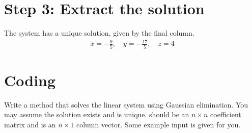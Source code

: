 \documentclass[letterpaper,10pt,english]{jupyterBook}
\begin{document}
\section{Step 3: Extract the solution}
\label{\detokenize{lessons/Gaussian_Elimination-student:step-3-extract-the-solution}}
\sphinxAtStartPar
The system has a unique solution, given by the final column.
\begin{equation*}
\begin{split}
x = -\frac95, \quad y = -\frac{17}{5}, \quad z = 4
\end{split}
\end{equation*}

\section{Coding}
\label{\detokenize{lessons/Gaussian_Elimination-student:coding}}
\sphinxAtStartPar
Write a method  that solves the linear system  using Gaussian elimination. You may assume the solution exists and is unique.  should be an \(n \times n\) coefficient matrix and  is an \(n \times 1\) column vector. Some example input is given for you.
\end{document}
